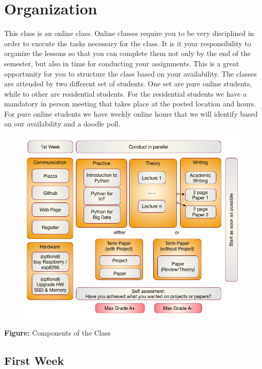\FILENAME

\section{Organization}\label{organization}

This class is an online class. Online classes require you to be very
disciplined in order to execute the tasks necessary for the class. It is
it your responsibility to organize the lessons so that you can complete
them not only by the end of the semester, but also in time for
conducting your assignments. This is a great opportunity for you to
structure the class based on your availability. The classes are attended
by two different set of students. One set are pure online students,
while to other are residential students. For the residential students we
have a mandatory in person meeting that takes place at the posted
location and hours. For pure online students we have weekly online hours
that we will identify based on our availability and a doodle poll.

\begin{figure}
\centering
\includegraphics{../../images/i523-overview.png}
\caption{}
\end{figure}

\textbf{Figure:} Components of the Class

\subsection{First Week}\label{first-week}

